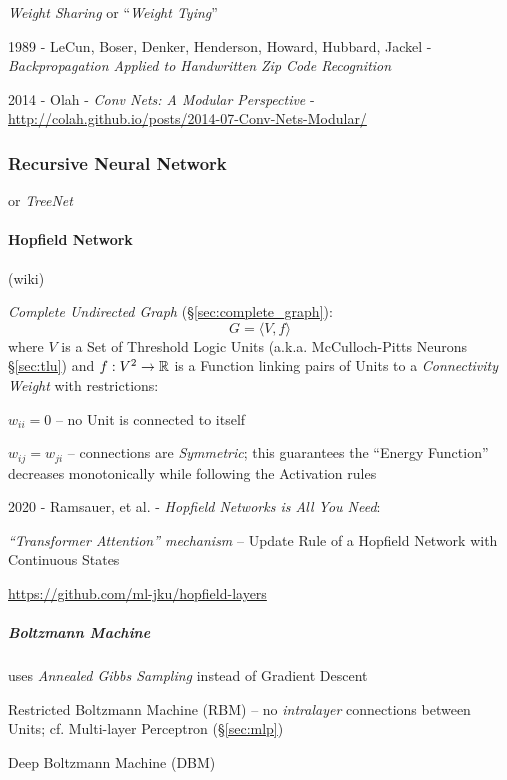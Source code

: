 \emph{Weight Sharing} or ``\emph{Weight Tying}''

1989 - LeCun, Boser, Denker, Henderson, Howard, Hubbard, Jackel -
  \emph{Backpropagation Applied to Handwritten Zip Code Recognition}

2014 - Olah - \emph{Conv Nets: A Modular Perspective} -
  \url{http://colah.github.io/posts/2014-07-Conv-Nets-Modular/}



\subsubsection{Recursive Neural Network}\label{sec:recursive_nn}

or \emph{TreeNet}



\paragraph{Hopfield Network}\label{sec:hopfield_network}\hfill

(wiki)

\emph{Complete Undirected Graph} (\S\ref{sec:complete_graph}):
\[
  G = \langle{V, f}\rangle
\]
where $V$ is a Set of Threshold Logic Units (a.k.a. McCulloch-Pitts Neurons
\S\ref{sec:tlu}) and $f : V^2 \to \mathbb{R}$ is a Function linking pairs of
Units to a \emph{Connectivity Weight} with restrictions:

$w_{ii} = 0$ -- no Unit is connected to itself

$w_{ij} = w_{ji}$ -- connections are \emph{Symmetric}; this guarantees the
``Energy Function'' decreases monotonically while following the Activation rules

\asterism

2020 - Ramsauer, et al. - \emph{Hopfield Networks is All You Need}:

\emph{``Transformer Attention'' mechanism} -- Update Rule of a Hopfield Network
with Continuous States

\url{https://github.com/ml-jku/hopfield-layers}



\subparagraph{Boltzmann Machine}\label{sec:boltzmann_machine}\hfill

uses \emph{Annealed Gibbs Sampling} instead of Gradient Descent

Restricted Boltzmann Machine (RBM) -- no \emph{intralayer} connections between
Units; cf. Multi-layer Perceptron (\S\ref{sec:mlp})

Deep Boltzmann Machine (DBM)

